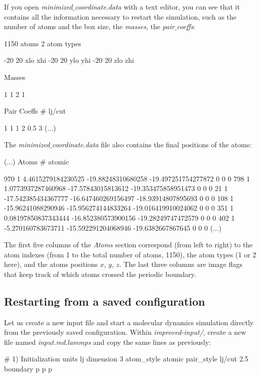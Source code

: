 \vspace{0.25cm} \noindent If you open \textit{minimized$\_$coordinate.data} with a text editor, you can see
that it contains all the information necessary to restart the
simulation, such as the number of atoms and the box size, the
\textit{masses}, the \textit{pair$\_$coeffs}:

\begin{lcverbatim}
1150 atoms
2 atom types

-20 20 xlo xhi
-20 20 ylo yhi
-20 20 zlo zhi

Masses

1 1
2 1

Pair Coeffs # lj/cut

1 1 1
2 0.5 3
(...)
\end{lcverbatim}

\noindent The \textit{minimized$\_$coordinate.data} file also contains the final
positions of the atoms:

\begin{lcverbatim}
(...)
Atoms # atomic

970 1 4.4615279184230525 -19.88248310680258 -19.497251754277872 0 0 0
798 1 1.0773937287460968 -17.57843015813612 -19.353475858951473 0 0 0
21 1 -17.542385434367777 -16.647460269156497 -18.93914807895693 0 0 0
108 1 -15.96241088290946 -15.956274144833264 -19.016419910024062 0 0 0
351 1 0.08197850837343444 -16.852380573900156 -19.28249747472579 0 0 0
402 1 -5.270160783673711 -15.592291204068946 -19.6382667867645 0 0 0
(...)
\end{lcverbatim}

\noindent The first five columns of the \textit{Atoms} section
correspond (from left to right) to the atom indexes (from 1
to the total number of atoms, 1150), the atom types (1 or 2
here), and the atoms positions $x$, $y$, $z$.
The last three columns are image flags that keep track of which
atoms crossed the periodic boundary.

\subsection{Restarting from a saved configuration}
\noindent Let us create a new input file and start a
molecular dynamics simulation directly from the previously
saved configuration. Within \textit{improved-input/}, create a new file
named \textit{input.md.lammps} and copy the same lines as previously:

\begin{lcverbatim}
# 1) Initialization
units lj
dimension 3
atom_style atomic
pair_style lj/cut 2.5
boundary p p p
\end{lcverbatim}


